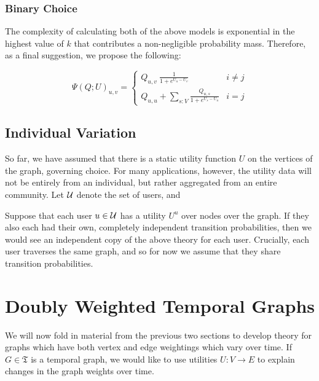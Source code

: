 \documentclass{article}
\theoremstyle{definition}
\begin{document}
	\subsubsection{Binary Choice}
	The complexity of calculating both of the above models is exponential in the highest value of $k$ that contributes a non-negligible probability mass. Therefore, as a final suggestion, we propose the following:
	
	\begin{equation*}
		\Psi(Q;U)_{u,v} = \begin{cases}
			\displaystyle Q_{u,v} ~\frac{\displaystyle 1}{\displaystyle 1 + e^{U_u - U_v}} & i \neq j \\
			\displaystyle Q_{u,u} + \sum_{s: V} \frac{\displaystyle Q_{u,s}}{\displaystyle 1 + e^{U_s - U_u}}& i = j
		\end{cases}
	\end{equation*}
	

	
	
	\subsection{Individual Variation}
	So far, we have assumed that there is a static utility function $U$ on the vertices of the graph, governing choice. For many applications, however, the utility data will not be entirely from an individual, but rather aggregated from an entire community. Let $\cal U$ denote the set of users, and 
	
	Suppose that each user $u \in \cal U$ has a utility $U^u$ over nodes over the graph. If they also each had their own, completely independent transition probabilities, then we would see an independent copy of the above theory for each user. Crucially, each user traverses the same graph, and so for now we assume that they share transition probabilities. 
	
	\section{Doubly Weighted Temporal Graphs}
	We will now fold in material from the previous two sections to develop theory for graphs which have both vertex and edge weightings which vary over time. If $G \in \mathfrak T$ is a temporal graph, we would like to use utilities $U : V \to E$ to explain changes in the graph weights over time.  
		
\end{document}
